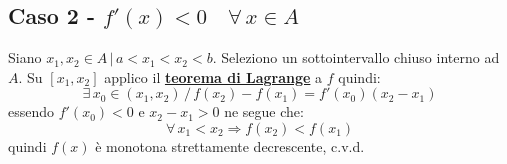 \documentclass[../dimostrazioni]{subfiles}
\begin{document}
            \subsection*{Caso 2 - \( f'(x) < 0 \quad \forall \, x \in A \)}

            Siano \(x_1, x_2 \in A \, | \, a < x_1 < x_2 < b \). Seleziono un sottointervallo chiuso interno ad \(A\).
            Su \( [x_1, x_2] \) applico il \textbf{\hyperref[teoLagrange]{teorema di Lagrange}} a \(f\) quindi:
            \[
                \exists \, x_0 \in (x_1, x_2) \, / \, f(x_2) - f(x_1) = f'(x_0)(x_2 - x_1) 
            \]
            essendo \( f'(x_0) < 0 \) e \( x_2 - x_1 > 0 \) ne segue che:
            \[
                \forall \, x_1 < x_2 \Rightarrow f(x_2) < f(x_1)
            \]
            quindi \(f(x)\) è monotona strettamente decrescente, c.v.d.
    
    
\end{document}
